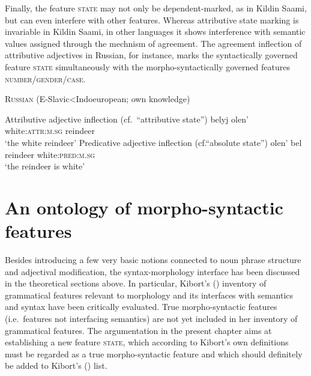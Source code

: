 Finally, the feature \textsc{state} may not only be dependent-marked, as in Kildin Saami, but can even interfere with other features. Whereas attributive state marking is invariable in Kildin Saami, in other languages it shows interference with semantic values assigned through the mechnism of agreement. The agreement inflection of attributive adjectives in Russian, for instance, marks the syntactically governed feature \textsc{state} simultaneously with the morpho-syn\-tacti\-cally governed features \textsc{number/\-gender/\-case}.
\begin{exe}
\ex \textsc{Russian} (E-Sla\-vic<Indoeuropean; own knowledge)
\label{state np russian}
\begin{xlist}
\ex Attributive adjective inflection (cf.~“attributive state”)
\gll 	belyj	olen'\\
	white:\textsc{attr:m.sg}	reindeer\\
\glt 	‘the white reindeer’
\ex	Predicative adjective inflection (cf.“absolute state”)
\gll	olen' bel\\
	reindeer white:\textsc{pred:m.sg}\\
\glt	‘the reindeer is white’
\end{xlist}
\end{exe}

\section{An ontology of morpho-syntactic features}

Besides introducing a few very basic notions connected to noun phrase structure and adjectival modification, the syntax-morphology interface has been discussed in the theoretical sections above. In particular, Kibort's (\citeyear{kibort2008a}) inventory of grammatical features relevant to morphology and its interfaces with semantics and syntax have been critically evaluated. True morpho-syntactic features (i.e.~features not interfacing semantics) are not yet included in her inventory of grammatical features. The argumentation in the present chapter aims at establishing a new feature \textsc{state}, which according to Kibort's own definitions must be regarded as a true morpho-syntactic feature and which should definitely be added to Kibort's (\citeyear{kibort2008a}) list. 


